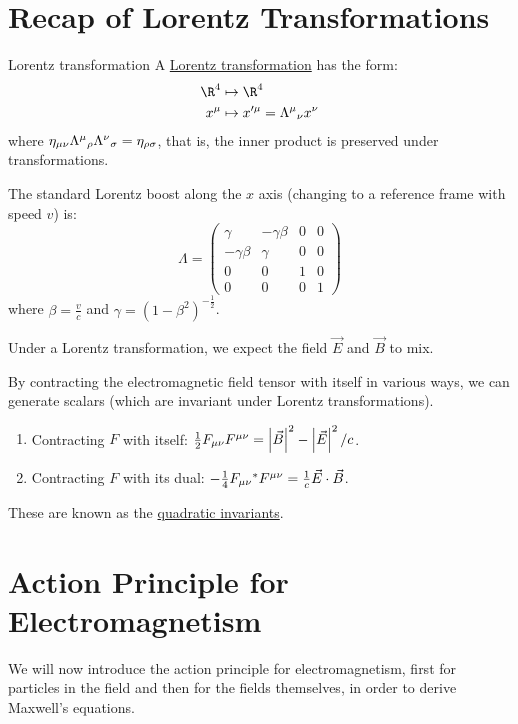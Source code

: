 \documentclass[../Main.tex]{subfiles}
\begin{document}
\section{Recap of Lorentz Transformations}
\begin{definition}{Lorentz transformation}
    A \underline{Lorentz transformation} has the form:
    \begin{align*}
        \R^4 &\mapsto \R^4\\
        x^\mu &\mapsto x^{\prime \mu} = \indx\Lambda\mu\nu x^\nu
    \end{align*}
    where $\eta_{\mu \nu} \indx\Lambda\mu\rho\indx\Lambda\nu\sigma = \eta_{\rho \sigma}$, that is, the inner product is preserved under transformations.
\end{definition}
The standard Lorentz boost along the $x$ axis (changing to a reference frame with speed $v$) is:
\begin{equation*}
    \Lambda =
    \begin{pmatrix}
        \gamma & -\gamma\beta & 0 & 0 \\
        -\gamma\beta & \gamma & 0 & 0 \\
        0 & 0 & 1 & 0 \\
        0 & 0 & 0 & 1
    \end{pmatrix}
\end{equation*}
where $\beta = \frac{v}{c}$ and $\gamma = (1 - \beta^2)^{-\frac12}$.

Under a Lorentz transformation, we expect the field $\vec{E}$ and $\vec{B}$ to mix.

By contracting the electromagnetic field tensor with itself in various ways, we can generate scalars (which are invariant under Lorentz transformations).
\begin{enumerate}
    \item Contracting $F$ with itself: $\frac12 F_{\mu \nu} F^{\mu \nu} = \left|\vec{B}\right|^2 - \left|\vec{E}\right|^2 / c$.
    \item Contracting $F$ with its dual: $-\frac14 F_{\mu \nu} {}^*F^{\mu \nu} = \frac1c \vec{E} \cdot \vec{B}$.
\end{enumerate}
These are known as the \underline{quadratic invariants}.
\section{Action Principle for Electromagnetism}
We will now introduce the action principle for electromagnetism, first for particles in the field and then for the fields themselves, in order to derive Maxwell's equations.
\end{document}
